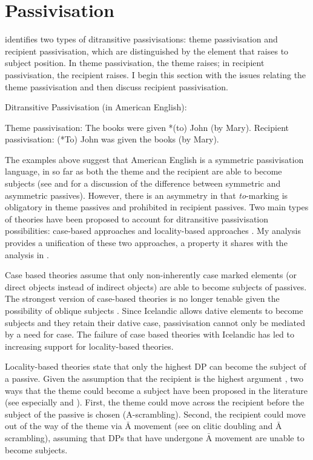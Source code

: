 \section{Passivisation}\label{sec:pass}
\cite{Allen.1999} identifies two types of ditransitive passivisations: theme passivisation and recipient passivisation, which are distinguished by the element that raises to subject position. In theme passivisation, the theme raises; in recipient passivisation, the recipient raises. I begin this section with the issues relating the theme passivisation and then discuss recipient passivisation.
\begin{exe}
\ex Ditransitive Passivisation (in American English):
\begin{xlist}
\ex Theme passivisation: The books were given *(to) John (by Mary).
\ex Recipient passivisation: (*To) John was given the books (by Mary).
\end{xlist}
\end{exe}%
The examples above suggest that American English is a symmetric passivisation language, in so far as both the theme and the recipient are able to become subjects (see \cite{Woolford.1993} and \cite{Anagnostopoulou.2003} for a discussion of the difference between symmetric and asymmetric passives). However, there is an asymmetry in that \textit{to}-marking is obligatory in theme passives and prohibited in recipient passives. Two main types of theories have been proposed to account for ditransitive passivisation possibilities: case-based approaches \citep{Larson.1988,Baker.1988,Pesetsky.1996,Holmberg.2001} and locality-based approaches \citep{Falk.1990,Holmberg.1995,McGinnis.1998,Anagnostopoulou.2003}. My analysis provides a unification of these two approaches, a property it shares with the analysis in \cite{Platzack.2005}. 

Case based theories assume that only non-inherently case marked elements (or direct objects instead of indirect objects) are able to become subjects of passives. The strongest version of case-based theories is no longer tenable given the possibility of oblique subjects \citep{Zaenen.1985}. Since Icelandic allows dative elements to become subjects and they retain their dative case, passivisation cannot only be mediated by a need for case. The failure of case based theories with Icelandic has led to increasing support for locality-based theories. 

Locality-based theories state that only the highest DP can become the subject of a passive. Given the assumption that the recipient is the highest argument \citep{Georgala.2011}, two ways that the theme could become a subject have been proposed in the literature (see especially \cite{McGinnis.2001} and \cite{Anagnostopoulou.2003}). First, the theme could move across the recipient before the subject of the passive is chosen (A-scrambling). Second, the recipient could move out of the way of the theme via $\bar{\text{A}}$ movement (see \cite{Anagnostopoulou.2003} on clitic doubling and $\bar{\text{A}}$ scrambling), assuming that DPs that have undergone $\bar{\text{A}}$ movement are unable to become subjects. 


